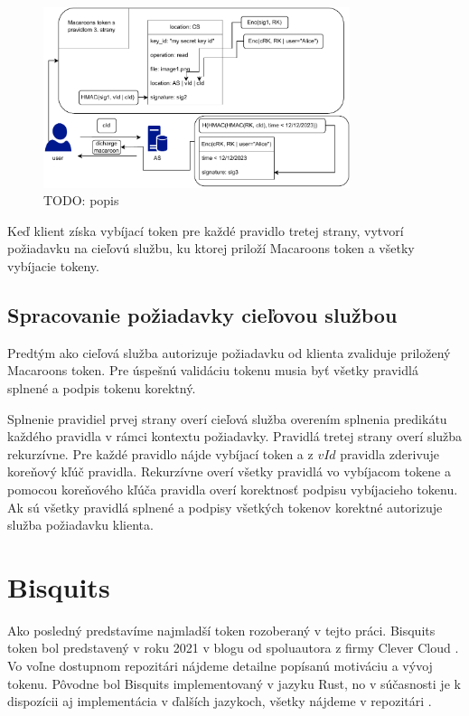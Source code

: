 \begin{figure}
    \centerline{\includegraphics[width=0.8\textwidth]{images/user_request}}
    \caption[Získanie vybíjacieho tokenu používateľom]{TODO: popis}
    \label{fig:user_request}
\end{figure}

Keď klient získa vybíjací token pre každé pravidlo tretej strany, vytvorí požiadavku na cieľovú službu, ku ktorej priloží Macaroons token a všetky vybíjacie tokeny.

\subsection{Spracovanie požiadavky cieľovou službou}

Predtým ako cieľová služba autorizuje požiadavku od klienta zvaliduje priložený Macaroons token. Pre úspešnú validáciu tokenu musia byť všetky pravidlá splnené a podpis tokenu korektný.

Splnenie pravidiel prvej strany overí cieľová služba overením splnenia predikátu každého pravidla v rámci kontextu požiadavky. Pravidlá tretej strany overí služba rekurzívne. Pre každé pravidlo nájde vybíjací token a z $vId$ pravidla zderivuje koreňový kľúč pravidla. Rekurzívne overí všetky pravidlá vo vybíjacom tokene a pomocou koreňového kľúča pravidla overí korektnosť podpisu vybíjacieho tokenu. Ak sú všetky pravidlá splnené a podpisy všetkých tokenov korektné autorizuje služba požiadavku klienta.

\section{Bisquits}

Ako posledný predstavíme najmladší token rozoberaný v tejto práci. Bisquits token bol predstavený v roku 2021 v blogu od spoluautora z firmy Clever Cloud \cite{biscuits_blog}. Vo voľne dostupnom repozitári \cite{biscuits_git} nájdeme detailne popísanú motiváciu a vývoj tokenu. Pôvodne bol Bisquits implementovaný v jazyku Rust, no v súčasnosti je k dispozícii aj implementácia v ďalších jazykoch, všetky nájdeme v repozitári \cite{biscuits_git}.

